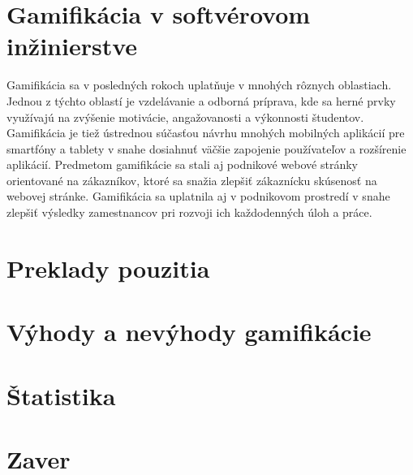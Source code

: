 \documentclass[14pt,twoside,a4paper]{article}
\begin{document}
\section{Gamifikácia v softvérovom inžinierstve}
Gamifikácia sa v posledných rokoch uplatňuje v mnohých rôznych oblastiach. 
Jednou z týchto oblastí je vzdelávanie a odborná príprava, 
kde sa herné prvky využívajú na zvýšenie motivácie, 
angažovanosti a výkonnosti študentov. 
Gamifikácia je tiež ústrednou súčasťou návrhu mnohých 
mobilných aplikácií pre smartfóny a tablety v snahe 
dosiahnuť väčšie zapojenie používateľov a rozšírenie aplikácií. 
Predmetom gamifikácie sa stali aj podnikové webové 
stránky orientované na zákazníkov, 
ktoré sa snažia zlepšiť zákaznícku skúsenosť na webovej 
stránke. Gamifikácia sa uplatnila aj v podnikovom 
prostredí v snahe zlepšiť výsledky zamestnancov pri 
rozvoji ich každodenných úloh a práce\cite{gamifsoft}.




\section{Preklady pouzitia}
\section{Výhody a nevýhody gamifikácie}

\section{Štatistika}

\section{Zaver}





\end{document}
